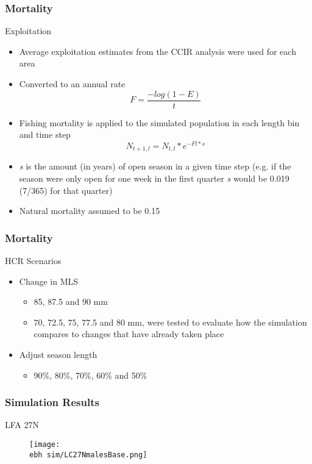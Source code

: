 \documentclass{beamer}
\newcommand{\ebh}{\string~/bio.data/bio.lobster/figures/LFA2733Framework2018/} %
\begin{document}
\begin{frame}
\frametitle{Mortality}
Exploitation
\begin{itemize}
\item Average exploitation estimates from the CCIR analysis were used for each area
\item Converted to an annual rate 
\begin{equation*}
F = \frac{-log(1-E)}{t}
\end{equation*}
\item Fishing mortality is applied to the simulated population in each length bin and time step
\begin{equation*}
N_{t+1, l} =  N_{t, l} * e^{-Fl * s}
\end{equation*}
\item \textit{s} is the amount (in years) of open season in a given time step (e.g. if the season were only open for one week in the first quarter \textit{s} would be 0.019 (7/365) for that quarter)
\item Natural mortality assumed to be 0.15
\end{itemize}
\end{frame}



\begin{frame}
\frametitle{Mortality}
HCR Scenarios
\begin{itemize}
\item Change in MLS
\begin{itemize}
\item 85, 87.5 and 90 mm
\item 70, 72.5, 75, 77.5 and 80 mm, were tested to evaluate how the simulation compares to changes that have already taken place
\end{itemize}
\item Adjust season length
\begin{itemize}
\item 90\%, 80\%, 70\%, 60\% and 50\%
\end{itemize}
\end{itemize}
\end{frame}



\begin{frame}
\frametitle{Simulation Results}
LFA 27N 
\begin{figure}
        \begin{center}
            \texttt{[image: \\ebh sim/LC27NmalesBase.png]}
        \end{center}
    \end{figure}
\end{frame}
\end{document}
